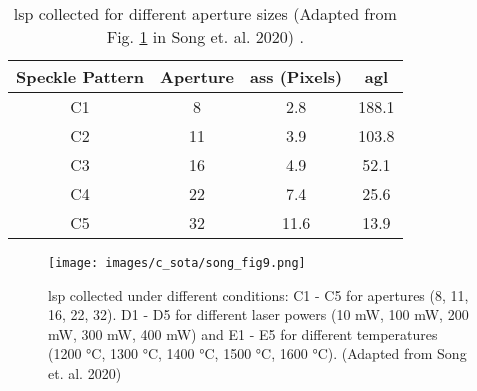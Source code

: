     \begin{table}[ht]
        \centering
        \footnotesize
        \renewcommand{\arraystretch}{1.2}
        \begin{tabular}{cccc}
            \toprule
            \textbf{Speckle Pattern} & \textbf{Aperture} & \textbf{\gls{ass} (Pixels)} & \textbf{\gls{agl}} \\
            \midrule
            
            C1 & 8 & 2.8 & 188.1 \\
            C2 & 11 & 3.9 & 103.8 \\
            C3 & 16 & 4.9 & 52.1 \\
            C4 & 22 & 7.4 & 25.6 \\
            C5 & 32 & 11.6 & 13.9 \\
    
            \bottomrule
        \end{tabular}
        \caption{\gls{lsp} collected for different aperture sizes (Adapted from Fig. \ref{fig:song_fig9} in Song et. al. 2020) \cite{song}.}
        \label{table:song_table_c}
    \end{table}

    \begin{figure}[ht]
        \centering
        \texttt{[image: images/c\_sota/song\_fig9.png]}
        \caption{\gls{lsp} collected under different conditions: C1 - C5 for apertures (8, 11, 16, 22, 32). D1 - D5 for different laser powers (10 mW, 100 mW, 200 mW, 300 mW, 400 mW) and E1 - E5 for different temperatures (1200 °C, 1300 °C, 1400 °C, 1500 °C, 1600 °C). (Adapted from Song et. al. 2020) \cite{song}}
        \label{fig:song_fig9}
    \end{figure} 


    
